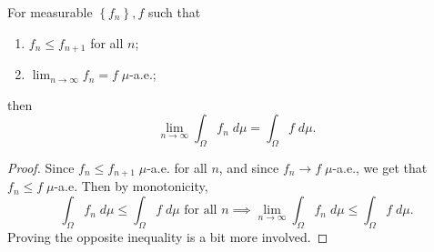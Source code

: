 \documentclass[twoside,10pt]{article}
\begin{document}
\begin{thrm}
For measurable $\left\{ f_{n} \right\}, f$ such that
\begin{enumerate}
	\item $f_{n} \leq f_{n+1}$ for all $n$;
	\item $\lim_{n \to \infty} f_{n} = f \; \mu$-a.e.;
\end{enumerate}
then
\[
\lim_{n \to \infty} \int_{\Omega} f_{n}\;d\mu = \int_{\Omega} f\;d\mu.
\] 
\end{thrm}
\begin{proof}
	Since $f_{n} \leq f_{n+1} \;\mu$-a.e. for all $n$, and since $f_{n} \to f\;\mu$-a.e., we get that $f_{n} \leq f \;\mu$-a.e. Then by monotonicity,
	\[
	\int_{\Omega} f_{n}\;d\mu \leq \int_{\Omega} f\;d\mu \text{ for all } n \implies \lim_{n \to \infty} \int_{\Omega} f_{n}\;d\mu \leq \int_{\Omega} f\;d\mu.
	\] Proving the opposite inequality is a bit more involved. 
\end{proof}
\end{document}
